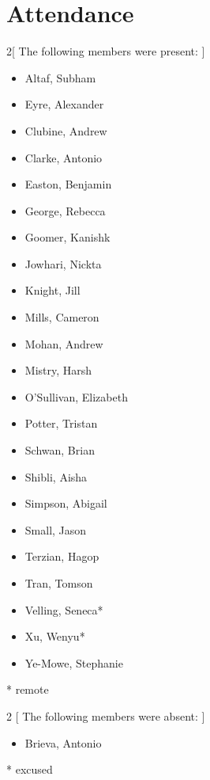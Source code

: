 \section*{Attendance}

\begin{multicols}{2}[
        The following members were present:
    ]

\begin{itemize}
    \item Altaf, Subham
    \item Eyre, Alexander
    \item Clubine, Andrew
    \item Clarke, Antonio
    \item Easton, Benjamin
    \item George, Rebecca
    \item Goomer, Kanishk
    \item Jowhari, Nickta 
    \item Knight, Jill
    \item Mills, Cameron
    \item Mohan, Andrew
    \item Mistry, Harsh
    \item O'Sullivan, Elizabeth
    \item Potter, Tristan
    \item Schwan, Brian
    \item Shibli, Aisha
    \item Simpson, Abigail
    \item Small, Jason
    \item Terzian, Hagop
    \item Tran, Tomson
    \item Velling, Seneca*
    \item Xu, Wenyu*
    \item Ye-Mowe, Stephanie
\end{itemize}

\end{multicols}
* remote \\

\begin{multicols}{2}
    [
        The following members were absent:
    ]
\begin{itemize}
    \item Brieva, Antonio
\end{itemize}
\end{multicols}
* excused\\


